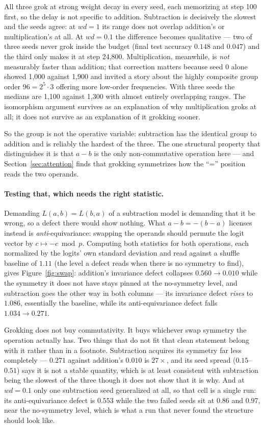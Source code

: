 \documentclass[11pt]{article}
\begin{document}
All three grok at strong weight decay in every seed, each memorizing at step
100 first, so the delay is not specific to addition. Subtraction is decisively
the slowest and the seeds agree: at $wd = 1$ its range does not overlap
addition's or multiplication's at all. At $wd = 0.1$ the difference becomes
qualitative --- two of three seeds never grok inside the budget (final test
accuracy $0.148$ and $0.047$) and the third only makes it at step 24{,}800.
Multiplication, meanwhile, is \emph{not} measurably faster than addition;
that correction matters because seed 0 alone showed 1{,}000 against 1{,}900 and
invited a story about the highly composite group order $96 = 2^5 \cdot 3$
offering more low-order frequencies. With three seeds the medians are 1{,}100
against 1{,}300 with almost entirely overlapping ranges. The isomorphism
argument survives as an explanation of why multiplication groks at all; it does
not survive as an explanation of it grokking sooner.

So the group is not the operative variable: subtraction has the identical group
to addition and is reliably the hardest of the three. The one structural
property that distinguishes it is that $a - b$ is the only non-commutative
operation here --- and Section~\ref{sec:attention} finds that grokking
symmetrizes how the ``='' position reads the two operands.

\paragraph{Testing that, which needs the right statistic.} Demanding
$L(a,b) = L(b,a)$ of a subtraction model is demanding that it be wrong, so a
defect there would show nothing. What $a - b = -(b-a)$ licenses instead is
\emph{anti}-equivariance: swapping the operands should permute the logit
vector by $c \mapsto -c \bmod p$. Computing both statistics for both
operations, each normalized by the logits' own standard deviation and read
against a shuffle baseline of $1.11$ (the level a defect reads when there is no
symmetry to find), gives Figure~\ref{fig:swap}: addition's invariance defect
collapses $0.560 \to 0.010$ while the symmetry it does not have stays pinned
at the no-symmetry level, and subtraction goes the other way in both columns
--- its invariance defect \emph{rises} to $1.086$, essentially the baseline,
while its anti-equivariance defect falls $1.034 \to 0.271$.

Grokking does not buy commutativity. It buys whichever swap symmetry the
operation actually has. Two things that do not fit that clean statement belong
with it rather than in a footnote. Subtraction acquires its symmetry far less
completely --- $0.271$ against addition's $0.010$ is $27\times$, and its seed
spread ($0.15$--$0.51$) says it is not a stable quantity, which is at least
consistent with subtraction being the slowest of the three though it does not
show that it is why. And at $wd = 0.1$ only one subtraction seed generalized at
all, so that cell is a single run: its anti-equivariance defect is $0.553$
while the two failed seeds sit at $0.86$ and $0.97$, near the no-symmetry
level, which is what a run that never found the structure should look like.
\end{document}
